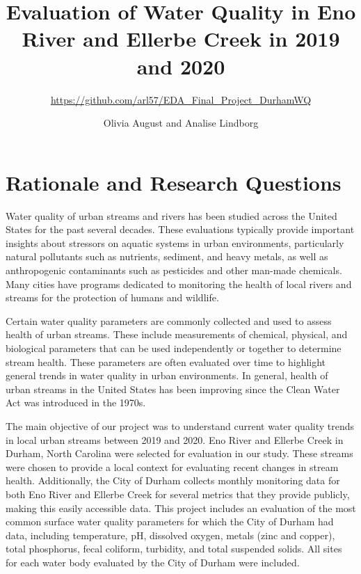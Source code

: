 \documentclass[
  12pt,
]{article}
\title{Evaluation of Water Quality in Eno River and Ellerbe Creek in
2019 and 2020}
\subtitle{\url{https://github.com/arl57/EDA_Final_Project_DurhamWQ}}
\author{Olivia August and Analise Lindborg}
\date{}
\begin{document}
\maketitle

\newpage
\tableofcontents 
\newpage
\listoffigures 
\newpage

\hypertarget{rationale-and-research-questions}{%
\section{Rationale and Research
Questions}\label{rationale-and-research-questions}}

Water quality of urban streams and rivers has been studied across the
United States for the past several decades. These evaluations typically
provide important insights about stressors on aquatic systems in urban
environments, particularly natural pollutants such as nutrients,
sediment, and heavy metals, as well as anthropogenic contaminants such
as pesticides and other man-made chemicals. Many cities have programs
dedicated to monitoring the health of local rivers and streams for the
protection of humans and wildlife.

Certain water quality parameters are commonly collected and used to
assess health of urban streams. These include measurements of chemical,
physical, and biological parameters that can be used independently or
together to determine stream health. These parameters are often
evaluated over time to highlight general trends in water quality in
urban environments. In general, health of urban streams in the United
States has been improving since the Clean Water Act was introduced in
the 1970s.

The main objective of our project was to understand current water
quality trends in local urban streams between 2019 and 2020. Eno River
and Ellerbe Creek in Durham, North Carolina were selected for evaluation
in our study. These streams were chosen to provide a local context for
evaluating recent changes in stream health. Additionally, the City of
Durham collects monthly monitoring data for both Eno River and Ellerbe
Creek for several metrics that they provide publicly, making this easily
accessible data. This project includes an evaluation of the most common
surface water quality parameters for which the City of Durham had data,
including temperature, pH, dissolved oxygen, metals (zinc and copper),
total phosphorus, fecal coliform, turbidity, and total suspended solids.
All sites for each water body evaluated by the City of Durham were
included.
\end{document}
